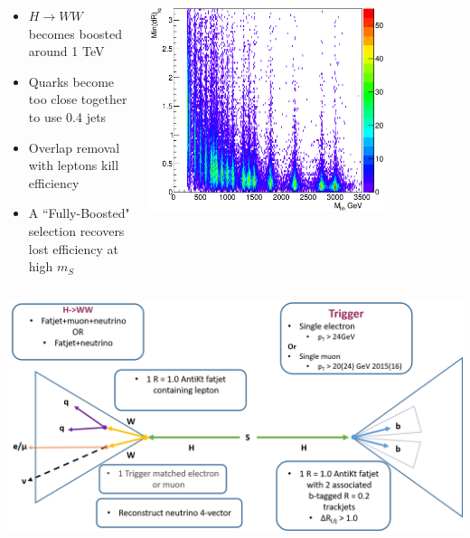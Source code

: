 \documentclass{beamer}
\newcommand*{\header}[1]{\fontsize{16}{8}\selectfont \textbf{{\color{MyPurple}{#1}}}}
\begin{document}
\begin{frame}
\begin{center}
\header{Motivation}
\end{center}
\vspace{-0.5cm}
\begin{columns}
\begin{column}{0.5\textwidth}
\begin{itemize}
\footnotesize
\item $H\rightarrow{}WW$ becomes boosted around 1 TeV 
\item Quarks become too close together to use 0.4 jets
\item Overlap removal with leptons kill efficiency
\item A ``Fully-Boosted" selection recovers lost efficiency at high $m_S$
\end{itemize}
\end{column}
\begin{column}{0.5\textwidth}
\begin{center}
\includegraphics[width=0.75\textwidth]{figures/drminlq}
\end{center}
\end{column}
\end{columns}
\end{frame}

\begin{frame}
\begin{center}
\header{Fully Boosted Event Selection}
\end{center}
\begin{center}
\includegraphics[width=1\textwidth]{figures/fullboost}
\end{center}
\end{frame}
\end{document}
